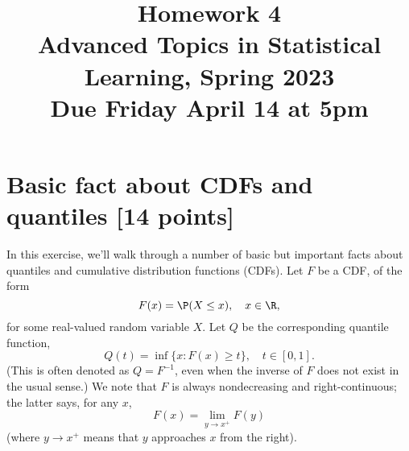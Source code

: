 \documentclass{article}
\title{Homework 4 \\ \smallskip
\large Advanced Topics in Statistical Learning, Spring 2023 \\ \smallskip
Due Friday April 14 at 5pm}
\date{}
\begin{document}
\maketitle
\RaggedRight
\vspace{-50pt}

\section{Basic fact about CDFs and quantiles [14 points]}

In this exercise, we'll walk through a number of basic but important facts about 
quantiles and cumulative distribution functions (CDFs). Let $F$ be a CDF, of the
form 
\[
F(x) = \P(X \leq x), \quad x \in \R,
\]
for some real-valued random variable $X$. Let $Q$ be the corresponding quantile 
function,
\[
Q(t) = \inf \{ x : F(x) \geq t \}, \quad t \in [0,1].
\]
(This is often denoted as $Q = F^{-1}$, even when the inverse of $F$ does not
exist in the usual sense.) We note that $F$ is always nondecreasing and 
right-continuous; the latter says, for any $x$,    
\[
F(x) = \lim_{y \to x^+} F(y)
\]
(where $y \to x^+$ means that $y$ approaches $x$ from the right).
\end{document}

